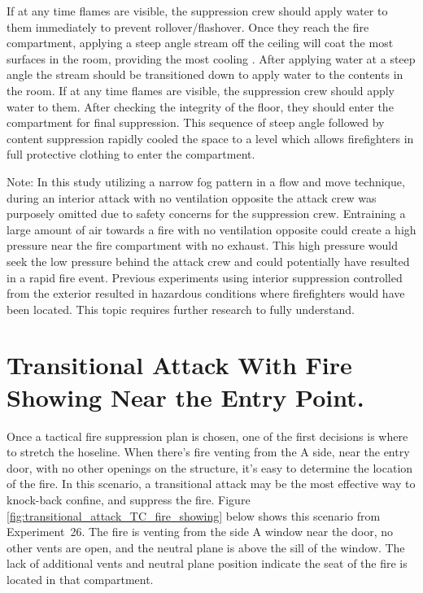 \documentclass[12pt,oneside]{book}
\begin{document}
If at any time flames are visible, the suppression crew should apply water to them immediately to prevent rollover/flashover. Once they reach the fire compartment, applying a steep angle stream off the ceiling will coat the most surfaces in the room, providing the most cooling \cite{Weinchenk_watermapping}. After applying water at a steep angle the stream should be transitioned down to apply water to the contents in the room.  If at any time flames are visible, the suppression crew should apply water to them. After checking the integrity of the floor, they should enter the compartment for final suppression. This sequence of steep angle followed by content suppression rapidly cooled the space to a level which allows firefighters in full protective clothing to enter the compartment.

Note: In this study utilizing a narrow fog pattern in a flow and move technique, during an interior attack with no ventilation opposite the attack crew was purposely omitted due to safety concerns for the suppression crew. Entraining a large amount of air towards a fire with no ventilation opposite could create a high pressure near the fire compartment with no exhaust. This high pressure would seek the low pressure behind the attack crew and could potentially have resulted in a rapid fire event. Previous experiments using interior suppression controlled from the exterior resulted in hazardous conditions where firefighters would have been located. This topic requires further research to fully understand.   

\section{Transitional Attack With Fire Showing Near the Entry Point.} \label{tc:transitional_attack_fire_showing}
Once a tactical fire suppression plan is chosen, one of the first decisions is where to stretch the hoseline. When there's fire venting from the A side, near the entry door, with no other openings on the structure, it's easy to determine the location of the fire. In this scenario, a transitional attack may be the most effective way to knock-back confine, and suppress the fire. Figure \ref{fig:transitional_attack_TC_fire_showing} below shows this scenario from Experiment~26. The fire is venting from the side A window near the door, no other vents are open, and the neutral plane is above the sill of the window. The lack of additional vents and neutral plane position indicate the seat of the fire is located in that compartment.
\end{document}
